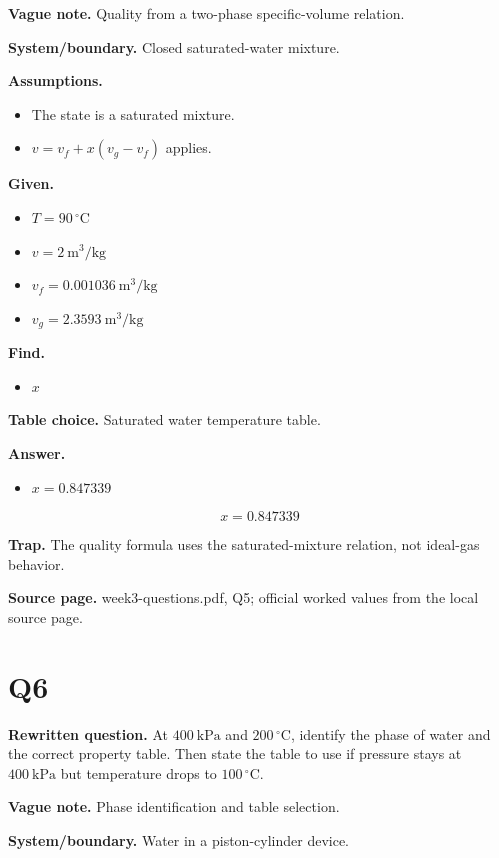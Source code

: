 \textbf{Vague note.} Quality from a two-phase specific-volume relation.

\textbf{System/boundary.} Closed saturated-water mixture.

\textbf{Assumptions.}
\begin{itemize}
  \item The state is a saturated mixture.
  \item $v = v_f + x(v_g-v_f)$ applies.
\end{itemize}

\textbf{Given.}
\begin{itemize}
  \item $T = 90\,^{\circ}\mathrm{C}$
  \item $v = 2\ \mathrm{m^3/kg}$
  \item $v_f = 0.001036\ \mathrm{m^3/kg}$
  \item $v_g = 2.3593\ \mathrm{m^3/kg}$
\end{itemize}

\textbf{Find.}
\begin{itemize}
  \item $x$
\end{itemize}

\textbf{Table choice.} Saturated water temperature table.

\textbf{Answer.}
\begin{itemize}
  \item $x = 0.847339$
\end{itemize}

\[\boxed{x = 0.847339}\]

\textbf{Trap.} The quality formula uses the saturated-mixture relation, not ideal-gas behavior.

\textbf{Source page.} week3-questions.pdf, Q5; official worked values from the local source page.

\section*{Q6}
\textbf{Rewritten question.} At $400\ \mathrm{kPa}$ and $200\,^{\circ}\mathrm{C}$, identify the phase of water and the correct property table. Then state the table to use if pressure stays at $400\ \mathrm{kPa}$ but temperature drops to $100\,^{\circ}\mathrm{C}$.

\textbf{Vague note.} Phase identification and table selection.

\textbf{System/boundary.} Water in a piston-cylinder device.

